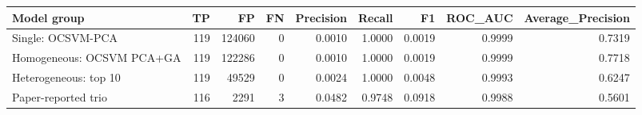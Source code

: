 \begin{tabular}{lrrrrrrrr}
\toprule
Model group & TP & FP & FN & Precision & Recall & F1 & ROC\_AUC & Average\_Precision \\
\midrule
Single: OCSVM-PCA & 119 & 124060 & 0 & 0.0010 & 1.0000 & 0.0019 & 0.9999 & 0.7319 \\
Homogeneous: OCSVM PCA+GA & 119 & 122286 & 0 & 0.0010 & 1.0000 & 0.0019 & 0.9999 & 0.7718 \\
Heterogeneous: top 10 & 119 & 49529 & 0 & 0.0024 & 1.0000 & 0.0048 & 0.9993 & 0.6247 \\
Paper-reported trio & 116 & 2291 & 3 & 0.0482 & 0.9748 & 0.0918 & 0.9988 & 0.5601 \\
\bottomrule
\end{tabular}
